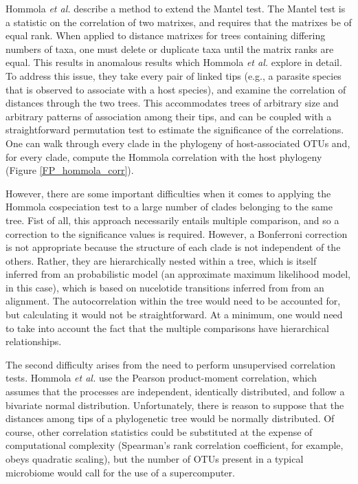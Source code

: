 Hommola {\em et al.} \cite{hommola2009permutation} describe a method to extend the Mantel test. \cite{mantel1967detection} The Mantel test is a statistic on the correlation of two matrixes, and requires that the matrixes be of equal rank. When applied to distance matrixes for trees containing differing numbers of taxa, one must delete or duplicate taxa until the matrix ranks are equal. This results in anomalous results which Hommola {\em et al.} explore in detail. To address this issue, they take every pair of linked tips (e.g., a parasite species that is observed to associate with a host species), and examine the correlation of distances through the two trees. This accommodates trees of arbitrary size and arbitrary patterns of association among their tips, and can be coupled with a straightforward permutation test to estimate the significance of the correlations. One can walk through every clade in the phylogeny of host-associated OTUs and, for every clade, compute the Hommola correlation with the host phylogeny (Figure \ref{FP_hommola_corr}). 



However, there are some important difficulties when it comes to applying the Hommola cospeciation test to a large number of clades belonging to the same tree. Fist of all, this approach necessarily entails multiple comparison, and so a correction to the significance values is required. However, a Bonferroni correction is not appropriate because the structure of each clade is not independent of the others. Rather, they are hierarchically nested within a tree, which is itself inferred from an probabilistic model (an approximate maximum likelihood model, in this case), which is based on nucelotide transitions inferred from from an alignment. The autocorrelation within the tree would need to be accounted for, but calculating it would not be straightforward. At a minimum, one would need to take into account the fact that the multiple comparisons have hierarchical relationships.

The second difficulty arises from the need to perform unsupervised correlation tests. Hommola {\em et al.} use the Pearson product-moment correlation, which assumes that the processes are independent, identically distributed, and follow a bivariate normal distribution. Unfortunately, there is reason to suppose that the distances among tips of a phylogenetic tree would be normally distributed. Of course, other correlation statistics could be substituted at the expense of computational complexity (Spearman's rank correlation coefficient, for example, obeys quadratic scaling), but the number of OTUs present in a typical microbiome would call for the use of a supercomputer.

